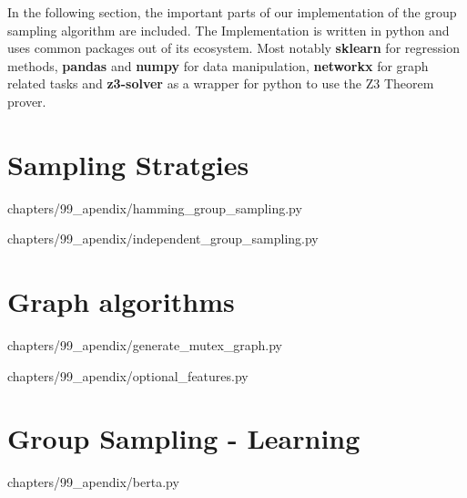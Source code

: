 \documentclass[../thesis.tex]{subfiles}
\begin{document}
In the following section, the important parts of our implementation of
the group sampling algorithm are included. The Implementation is written 
in python and uses common packages out of its ecosystem. Most notably 
\textbf{sklearn} for regression methods, \textbf{pandas} and \textbf{numpy} 
for data manipulation, \textbf{networkx} for graph related tasks and \textbf{z3-solver}
as a wrapper for python to use the Z3 Theorem prover.

\section{Sampling Stratgies}
\renewcommand{\lstlistingname}{Strategy}

{chapters/99_apendix/hamming_group_sampling.py}



{chapters/99_apendix/independent_group_sampling.py}


\section{Graph algorithms}
\renewcommand{\lstlistingname}{Algorithm}

{chapters/99_apendix/generate_mutex_graph.py}


{chapters/99_apendix/optional_features.py}


\section{Group Sampling - Learning}

{chapters/99_apendix/berta.py}
\end{document}
